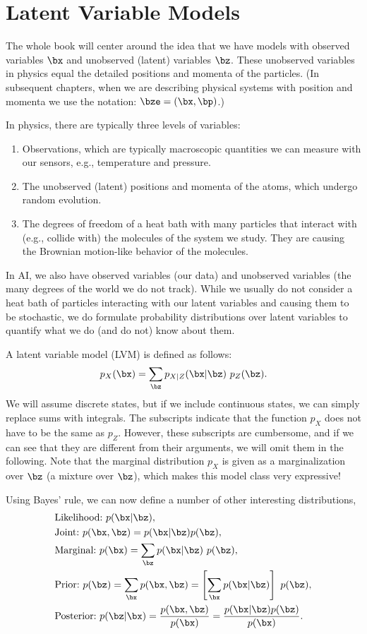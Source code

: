 \documentclass{lecture}
\begin{document}
\makeheader

\section{Latent Variable Models}
The whole book will center around the idea that we have models with observed variables $\bx$ and unobserved (latent) variables $\bz$. These unobserved variables in physics equal the detailed positions and momenta of the particles. (In subsequent chapters, when we are describing physical systems with position and momenta we use the notation: $\bze=(\bx,\bp)$.)

In physics, there are typically three levels of variables:
\begin{enumerate}
	\item[1.] Observations, which are typically macroscopic quantities we can measure with our sensors, e.g., temperature and pressure.
	\item[2.] The unobserved (latent) positions and momenta of the atoms, which undergo random evolution.
	\item[3.] The degrees of freedom of a heat bath with many particles that interact with (e.g., collide with) the molecules of the system we study. They are causing the Brownian motion-like behavior of the molecules.
\end{enumerate}
In AI, we also have observed variables (our data) and unobserved variables (the many degrees of the world we do not track). While we usually do not consider a heat bath of particles interacting with our latent variables and causing them to be stochastic, we do formulate probability distributions over latent variables to quantify what we do (and do not) know about them.

A latent variable model (LVM) is defined as follows:
\begin{align}
	p_X(\bx) = \sum_{\bz} p_{X|Z}(\bx|\bz)~p_Z(\bz). \label{eqn:lvm}
\end{align}
We will assume discrete states, but if we include continuous states, we can simply replace sums with integrals. The subscripts indicate that the function $p_X$ does not have to be the same as $p_Z$. However, these subscripts are cumbersome, and if we can see that they are different from their arguments, we will omit them in the following. Note that the marginal distribution $p_X$ is given as a marginalization over $\bz$ (a mixture over $\bz$), which makes this model class very expressive!

Using Bayes' rule, we can now define a number of other interesting distributions,
\begin{align}
	 &\text{Likelihood:}~ p(\bx|\bz),\\
	 &\text{Joint:}~p(\bx,\bz)=p(\bx|\bz)p(\bz),\\
	 &\text{Marginal:}~p(\bx) = \sum_{\bz} p(\bx|\bz)~p(\bz),\\
	 &\text{Prior:}~p(\bz) = \sum_\bx p(\bx,\bz) = \left[\sum_{\bx} p(\bx|\bz)\right]~p(\bz),\\
	 &\text{Posterior:}~p(\bz|\bx) = \frac{p(\bx,\bz)}{p(\bx)}=\frac{p(\bx|\bz)p(\bz)}{p(\bx)}. \label{eqn:posterior}
\end{align}
\end{document}
